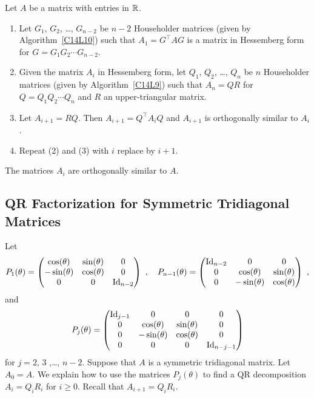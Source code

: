 \begin{algo}
Let $A$ be a \nn matrix with entries in $\mathbb{R}$.
\begin{enumerate}
\item Let $G_1$, $G_2$, \ldots, $G_{n-2}$ be $n-2$ Householder
matrices (given by Algorithm~\ref{C14L10}) such that
$A_1 = G^\top A G$ is a matrix in Hessemberg form for
$G=G_1 G_2 \cdots G_{n-2}$.
\item Given the \nn matrix $A_i$ in Hessemberg form, let $Q_1$, $Q_2$,
\ldots, $Q_n$ be $n$ Householder matrices (given by
Algorithm~\ref{C14L9}) such that $A_n = Q R$ for
$Q= Q_1 Q_2 \cdots Q_n$ and $R$ an upper-triangular \nn matrix.
\item Let $A_{i+1} = RQ$.  Then $A_{i+1} = Q^\top A_i Q$ and
$A_{i+1}$ is orthogonally similar to $A_i$.
\item Repeat (2) and (3) with $i$ replace by $i+1$.
\end{enumerate}
The matrices $A_i$ are orthogonally similar to $A$.
\end{algo}

\subsection{QR Factorization for Symmetric Tridiagonal Matrices}

Let
\[
P_1(\theta) =
\begin{pmatrix}
\cos(\theta) & \sin(\theta) & 0 \\
-\sin(\theta) & \cos(\theta) & 0 \\
0 & 0 & \operatorname{Id}_{n-2}
\end{pmatrix}
\ , \quad
P_{n-1}(\theta) =
\begin{pmatrix}
\operatorname{Id}_{n-2} & 0 & 0 \\
0 & \cos(\theta) & \sin(\theta) \\
0 & -\sin(\theta) & \cos(\theta) \\
\end{pmatrix} \ ,
\]
and
\[
P_j(\theta) =
\begin{pmatrix}
\operatorname{Id}_{j-1} & 0 & 0 & 0 \\
0 & \cos(\theta) & \sin(\theta) & 0 \\
0 & -\sin(\theta) & \cos(\theta) & 0 \\
0 & 0 & 0 & \operatorname{Id}_{n-j-1}
\end{pmatrix}
\]
for $j=2$, $3$ ,\ldots, $n-2$.  Suppose that $A$ is a symmetric tridiagonal
matrix.  Let $A_0 = A$.  We explain how to use the matrices $P_j(\theta)$ to
find a QR decomposition $A_i = Q_i R_i$ for $i \geq 0$.  Recall that
$A_{i+1} = Q_i R_i$.


